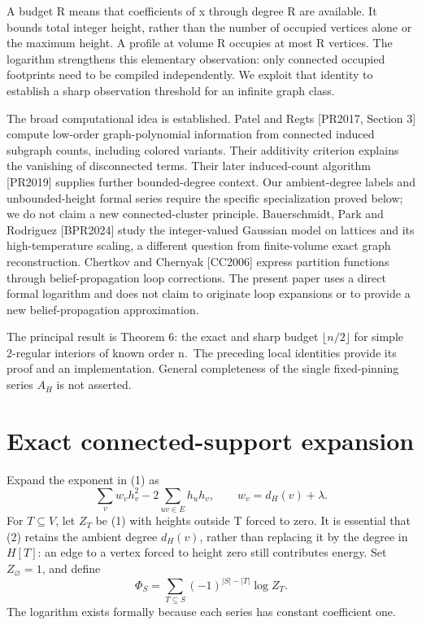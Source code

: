 \documentclass[
  11pt,
  a4paper,
]{article}
\begin{document}
A budget R means that coefficients of x through degree R are available.
It bounds total integer height, rather than the number of occupied
vertices alone or the maximum height. A profile at volume R occupies at
most R vertices. The logarithm strengthens this elementary observation:
only connected occupied footprints need to be compiled independently. We
exploit that identity to establish a sharp observation threshold for an
infinite graph class.

The broad computational idea is established. Patel and Regts {[}PR2017,
Section 3{]} compute low-order graph-polynomial information from
connected induced subgraph counts, including colored variants. Their
additivity criterion explains the vanishing of disconnected terms. Their
later induced-count algorithm {[}PR2019{]} supplies further
bounded-degree context. Our ambient-degree labels and unbounded-height
formal series require the specific specialization proved below; we do
not claim a new connected-cluster principle. Bauerschmidt, Park and
Rodriguez {[}BPR2024{]} study the integer-valued Gaussian model on
lattices and its high-temperature scaling, a different question from
finite-volume exact graph reconstruction. Chertkov and Chernyak
{[}CC2006{]} express partition functions through belief-propagation loop
corrections. The present paper uses a direct formal logarithm and does
not claim to originate loop expansions or to provide a new
belief-propagation approximation.

The principal result is Theorem 6: the exact and sharp budget
\(\lfloor n/2\rfloor\) for simple 2-regular interiors of known order
n.~The preceding local identities provide its proof and an
implementation. General completeness of the single fixed-pinning series
\(A_H\) is not asserted.

\hypertarget{exact-connected-support-expansion}{%
\section{Exact connected-support
expansion}\label{exact-connected-support-expansion}}

Expand the exponent in (1) as \[
\sum_v w_vh_v^2-2\sum_{uv\in E}h_uh_v,
\qquad w_v=d_H(v)+\lambda.
\tag{2}
\] For \(T\subseteq V\), let \(Z_T\) be (1) with heights outside T
forced to zero. It is essential that (2) retains the ambient degree
\(d_H(v)\), rather than replacing it by the degree in \(H[T]\): an edge
to a vertex forced to height zero still contributes energy. Set
\(Z_\varnothing=1\), and define \[
\Phi_S=\sum_{T\subseteq S}(-1)^{|S|-|T|}\log Z_T.
\tag{3}
\] The logarithm exists formally because each series has constant
coefficient one.
\end{document}
